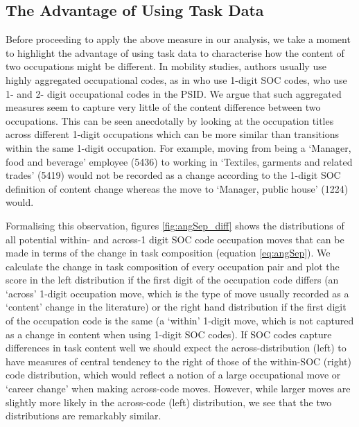 \documentclass[11pt, oneside]{article}
\begin{document}
	
	

	
	\subsection{The Advantage of Using Task Data}
	\label{sec:advantageTasks}
	Before proceeding to apply the above measure in our analysis, we take a moment to highlight the advantage of using task data to characterise how the content of two occupations might be different. In mobility studies, authors usually use highly aggregated occupational codes, as in \cite{Carrillo-Tudela2016} who use 1-digit SOC codes, \cite{kambourov2009occupational} who use 1- and 2- digit occupational codes in the PSID. We argue that such aggregated measures seem to capture very little of the content difference between two occupations. This can be seen anecdotally by looking at the occupation titles across different 1-digit occupations which can be more similar than transitions within the same 1-digit occupation. For example, moving from being a `Manager, food and beverage' employee (5436) to working in `Textiles, garments and related trades' (5419) would not be recorded as a change according to the 1-digit SOC definition of content change whereas the move to `Manager, public house' (1224) would. 
	
	\vspace{2mm}
	
	Formalising this observation, figures \ref{fig:angSep_diff} shows the distributions of all potential within- and across-1 digit SOC code occupation moves that can be made in terms of the change in task composition (equation \ref{eq:angSep}). We calculate the change in task composition of every occupation pair and plot the score in the left distribution if the first digit of the occupation code differs (an `across' 1-digit occupation move, which is the type of move usually recorded as a `content' change in the literature) or the right hand distribution if the first digit of the occupation code is the same (a `within' 1-digit move, which is not captured as a change in content when using 1-digit SOC codes). If SOC codes capture differences in task content well we should expect the across-distribution (left) to have measures of central tendency to the right of those of the within-SOC (right) code distribution, which would reflect a notion of a large occupational move or `career change' when making across-code moves. However, while larger moves are slightly more likely in the across-code (left) distribution, we see that the two distributions are remarkably similar. 
	
\end{document}
